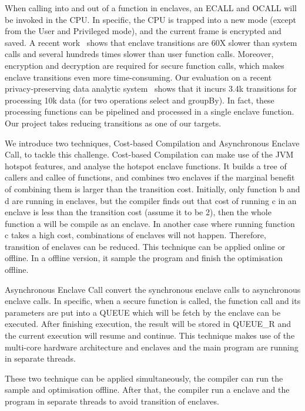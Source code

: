 When calling into and out of a function in enclaves, an ECALL and OCALL
will be invoked in the CPU. In specific, the CPU is trapped into a new mode 
(except from
the User and Privileged mode), and the current frame is encrypted and saved.
A recent work~\cite{sgxkernel:cf17} shows that enclave transitions are 60X 
slower
than system calls and several hundreds times slower than user function calls.
Moreover, encryption and decryption are required for secure function calls,
which makes enclave transitions even more time-consuming.
Our evaluation on a recent privacy-preserving data analytic 
system~\cite{opaque:nsdi17} shows that
it incurs 3.4k transitions for processing 10k data (for two operations select 
and groupBy).
In fact, these processing functions can be pipelined and processed in a single
enclave function. Our project takes reducing transitions as one of our targets.

We introduce two techniques, Cost-based Compilation and Asynchronous
Enclave Call, to tackle this challenge.
Cost-based Compilation can make use of the JVM hotspot features, and analyse
the hotspot enclave functions. It builds a tree of callers and callee of 
functions,
and combines two enclaves if the marginal benefit of combining them is larger 
than
the transition cost. Initially, only function b and d
are running in enclaves, but the compiler finds out that cost of running c in an 
enclave is less than the transition cost (assume it to be 2), then the whole 
function a will be compile as an enclave. In another case where running 
function c takes a high cost, combinations of enclaves will not happen.
Therefore, transition of enclaves can be reduced. This technique can be applied
online or offline. In a offline version, it sample the program and finish the
optimisation offline.

Asynchronous Enclave Call convert the synchronous enclave calls to asynchronous
enclave calls. In specific, when a secure function is called,
the function call and its parameters are put into a QUEUE which will be fetch by
the enclave can be executed. After finishing execution, the result will be 
stored
in QUEUE\_R and the current execution will resume and continue. 
This technique makes use of the multi-core
hardware architecture and enclaves and the main program are running in separate
threads.

These two technique can be applied simultaneously, the compiler can run the
sample and optimisation offline. After that, the compiler run a enclave and the 
program
in separate threads to avoid transition of enclaves.

